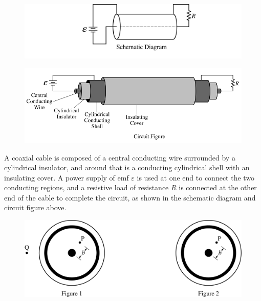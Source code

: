 %
\begin{figure}[H]
\centering
\includegraphics[scale=0.2]{images/img-022-037.png}
\end{figure}

\begin{figure}[H]
\centering
\includegraphics[scale=0.5]{images/2-a.png}
\end{figure}


\question
A coaxial cable is composed of a central conducting wire surrounded by a cylindrical insulator, and around that is a conducting cylindrical shell with an insulating cover. A power supply of emf $\varepsilon$ is used at one end to connect the two conducting regions, and a resistive load of resistance $R$ is connected at the other end of the cable to complete the circuit, as shown in the schematic diagram and circuit figure above. %

\begin{figure}[H]
\centering
\includegraphics[scale=0.2]{images/img-022-039.png}
\end{figure}

